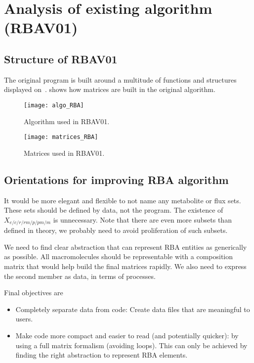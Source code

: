 \section{Analysis of existing algorithm (RBAV01)}

\subsection{Structure of RBAV01}
The original program is built around a multitude of functions and structures displayed on~.  shows how matrices are built in the original algorithm.

\begin{figure}[ht]
  \centering
  \texttt{[image: algo\_RBA]}
  \caption{Algorithm used in RBAV01.}
  \label{fig:algo_rba}
\end{figure}

\begin{figure}[ht]
  \centering
  \texttt{[image: matrices\_RBA]}
  \caption{Matrices used in RBAV01.}
  \label{fig:matrices_rba}
\end{figure}

\clearpage

\subsection{Orientations for improving RBA algorithm}

It would be more elegant and flexible to not name any metabolite or flux sets. These sets should be defined by data, not the program. The existence of $X_{e/c/r/rm/p/pm/m}$ is unnecessary. Note that there are even more subsets than defined in theory, we probably need to avoid proliferation of such subsets.

We need to find clear abstraction that can represent RBA entities as generically as possible. All macromolecules should be representable with a composition matrix that would help build the final matrices rapidly. We also need to express the second member as data, in terms of processes.

Final objectives are
\begin{itemize}
\item Completely separate data from code: Create data files that are meaningful to users.
\item Make code more compact and easier to read (and potentially quicker): by using a full matrix formalism (avoiding loops). This can only be achieved by finding the right abstraction to represent RBA elements.
\end{itemize}
